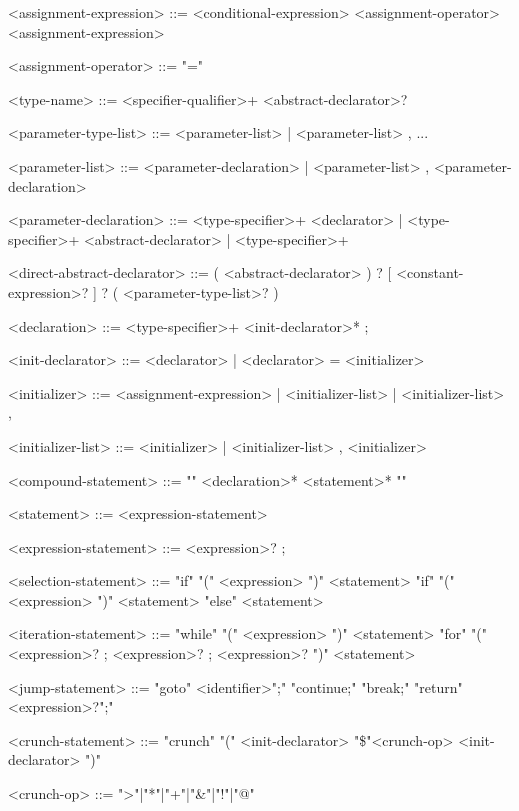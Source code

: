 \documentclass{article}
\begin{document}
\begin{grammar}
<assignment-expression> ::= <conditional-expression>
 <assignment-operator> <assignment-expression>

<assignment-operator> ::= "="

<type-name> ::= {<specifier-qualifier>}+ {<abstract-declarator>}?

<parameter-type-list> ::= <parameter-list>
                        | <parameter-list> , ...

<parameter-list> ::= <parameter-declaration>
                   | <parameter-list> , <parameter-declaration>

<parameter-declaration> ::= {<type-specifier>}+ <declarator>
                          | {<type-specifier>}+ <abstract-declarator>
                          | {<type-specifier>}+

<direct-abstract-declarator> ::=  ( <abstract-declarator> )
? [ {<constant-expression>}? ]
? ( {<parameter-type-list>}? )

<declaration> ::=  {<type-specifier>}+ {<init-declarator>}* ;

<init-declarator> ::= <declarator> | <declarator> = <initializer>

<initializer> ::= <assignment-expression> | { <initializer-list> } | { <initializer-list> , }

<initializer-list> ::= <initializer> | <initializer-list> , <initializer>

<compound-statement> ::= "{" {<declaration>}* {<statement>}* "}"

<statement> ::= <expression-statement>

<expression-statement> ::= {<expression>}? ;

<selection-statement> ::= "if" "(" <expression> ")" <statement>
\alt "if" "(" <expression> ")" <statement> "else" <statement>

<iteration-statement> ::= "while" "(" <expression> ")" <statement>
\alt "for" "(" {<expression>}? ; {<expression>}? ; {<expression>}? ")" <statement>

<jump-statement> ::= "goto" <identifier>";"
\alt "continue;"
\alt "break;"
\alt "return" {<expression>}?";"

<crunch-statement> ::= "crunch" "(" <init-declarator> "\$"<crunch-op> <init-declarator> ")"

<crunch-op> ::= ">"|"*"|"+"|"&"|"!"|"@"
\end{grammar}
\end{document}

